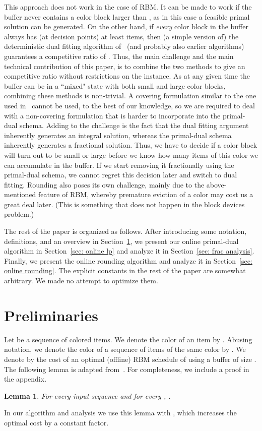 \documentclass[12pt]{article}
\newtheorem{lemma}[theorem]{Lemma}
\begin{document}
This approach does not work in the case of RBM. It can be made
to work if the buffer never contains a color block larger than
, as in this case a feasible primal solution can be
generated.
On the other hand, if {\em every} color block in the buffer
always has (at decision points) at least  items, then
(a simple version of)
the deterministic dual fitting algorithm of~\cite{AR10} (and
probably also earlier algorithms) guarantees a competitive
ratio of . Thus, the main challenge and
the main technical contribution of this paper, is to combine
the two methods to give an  competitive
ratio without restrictions on the instance. As at any given
time the buffer can be in a ``mixed" state with both small
and large color blocks, combining these methods is non-trivial.
A covering formulation similar to the one used in~\cite{ACER12}
cannot be used, to the best of our knowledge, so we are
required to deal with a non-covering formulation that is
harder to incorporate into the primal-dual schema. Adding 
to the challenge is the fact that the dual fitting argument
inherently generates an integral solution, whereas the 
primal-dual schema inherently
generates a fractional solution. Thus, we have to decide if
a color block will turn out to be small or large before we know
how many items of this color we can accumulate in the buffer.
If we start removing it fractionally using the primal-dual schema, 
we cannot regret this decision later and switch to dual fitting.
Rounding also poses its own challenge, mainly due to the
above-mentioned feature of RBM, whereby premature eviction
of a color may cost us a great deal later. (This is something
that does not happen in the block devices problem.)

The rest of the paper is organized as follows. After
introducing some notation, definitions, and an
overview in Section~\ref{sec: preliminaries}, we present
our online primal-dual algorithm in Section~\ref{sec: online lp} 
and analyze it in Section~\ref{sec: frac analysis}. Finally,
we present the online rounding algorithm and analyze
it in Section~\ref{sec: online rounding}. The explicit 
constants in the rest of the paper are somewhat
arbitrary. We made no attempt to optimize them.




\section{Preliminaries}\label{sec: preliminaries}

Let  be a sequence of colored items. We denote
the color of an item  by . Abusing notation, we
denote the color of a sequence  of items of the same
color by . We denote
by  the cost of an optimal (offline) RBM 
schedule of  using a buffer of size . The
following lemma is adapted from~\cite{ERW09,ACER12}.
For completeness, we include a proof in the appendix.
\begin{lemma}\label{lm: resource augmentation}
For every input sequence  and for every ,
.
\end{lemma}
In our algorithm and analysis we use this lemma with
, which increases the optimal
cost by a constant factor.
\end{document}
